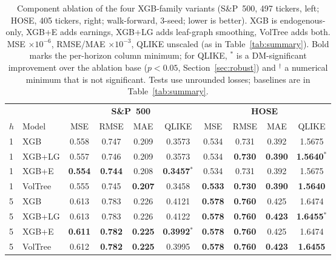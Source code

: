 \documentclass[runningheads]{llncs}
\begin{document}
\begin{table}[h!]
\centering
\caption{Component ablation of the four XGB-family variants (S\&P~500, 497 tickers, left; HOSE, 405
tickers, right; walk-forward, 3-seed; lower is better). XGB is endogenous-only, XGB+E adds earnings,
XGB+LG adds leaf-graph smoothing, VolTree adds both. MSE $\times10^{-6}$, RMSE/MAE $\times10^{-3}$,
QLIKE unscaled (as in Table~\ref{tab:summary}). Bold marks the per-horizon column minimum; for QLIKE,
$^{*}$ is a DM-significant improvement over the ablation base ($p<0.05$, Section~\ref{sec:robust}) and
$^{\dagger}$ a numerical minimum that is not significant. Tests use unrounded losses; baselines are in
Table~\ref{tab:summary}.}
\label{tab:detail}
\footnotesize
\setlength{\tabcolsep}{3pt}
\begin{tabular}{ll cccc cccc}
\toprule
& & \multicolumn{4}{c}{\textbf{S\&P~500}} & \multicolumn{4}{c}{\textbf{HOSE}} \\
\cmidrule(lr){3-6}\cmidrule(lr){7-10}
$h$ & Model & MSE & RMSE & MAE & QLIKE & MSE & RMSE & MAE & QLIKE \\
\midrule
1 & XGB      & 0.558 & 0.747 & 0.209 & 0.3573 & 0.534 & 0.731 & 0.392 & 1.5675 \\
1 & XGB+LG   & 0.557 & 0.746 & 0.209 & 0.3573 & 0.534 & \textbf{0.730} & \textbf{0.390} & \textbf{1.5640$^{*}$} \\
1 & XGB+E    & \textbf{0.554} & \textbf{0.744} & 0.208 & \textbf{0.3457$^{*}$} & 0.534 & 0.731 & 0.392 & 1.5675 \\
1 & VolTree  & 0.555 & 0.745 & \textbf{0.207} & 0.3458 & \textbf{0.533} & \textbf{0.730} & \textbf{0.390} & \textbf{1.5640} \\
\midrule
5 & XGB      & 0.613 & 0.783 & 0.226 & 0.4121 & \textbf{0.578} & \textbf{0.760} & 0.425 & 1.6474 \\
5 & XGB+LG   & 0.613 & 0.783 & 0.226 & 0.4122 & \textbf{0.578} & \textbf{0.760} & \textbf{0.423} & \textbf{1.6455$^{*}$} \\
5 & XGB+E    & \textbf{0.611} & \textbf{0.782} & \textbf{0.225} & \textbf{0.3992$^{*}$} & \textbf{0.578} & \textbf{0.760} & 0.425 & 1.6474 \\
5 & VolTree  & 0.612 & \textbf{0.782} & \textbf{0.225} & 0.3995 & \textbf{0.578} & \textbf{0.760} & \textbf{0.423} & \textbf{1.6455} \\

\end{tabular}
\end{table}
\end{document}

